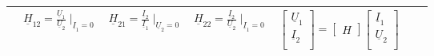 \begin{table}
\begin{tabular}{| c | c | c | c | c | c | c |}
			& $\underline{H}_{12}=\frac{\underline{U}_{1}}{\underline{U}_{2}} \mid_{\underline{I}_1=0}$
			& $\underline{H}_{21}=\frac{\underline{I}_{2}}{\underline{I}_{1}} \mid_{\underline{U}_2=0}$
			& $\underline{H}_{22}=\frac{\underline{I}_{2}}{\underline{U}_{2}} \mid_{\underline{I}_1=0}$
			& $ \begin{bmatrix}
					\underline{U}_{1}\\
					\underline{I}_{2}\\
				\end{bmatrix}
				=
				\begin{bmatrix}
					H
				\end{bmatrix}
				\begin{bmatrix}
					\underline{I}_{1}\\
					\underline{U}_{2}\\
				\end{bmatrix}$\\
		\hline
	\end{tabular}
	\renewcommand{\arraystretch}{\arraystretchOriginal}
	

\end{table}
